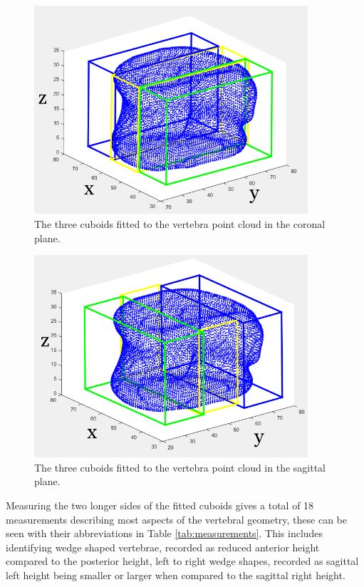\begin{figure}[ht!]
  \centering
  \includegraphics[width=4in]{Chapters/Chapter_PCA_images/Cuboid_fit_coronal.png}
  \caption{The three cuboids fitted to the vertebra point cloud in the coronal plane.}
  \label{fig:cuboid_cor}
\end{figure}

\begin{figure}[ht!]
  \centering
  \includegraphics[width=4in]{Chapters/Chapter_PCA_images/Cuboid_fit_sagital.png}
  \caption{The three cuboids fitted to the vertebra point cloud in the sagittal plane.}
  \label{fig:cuboid_sag}
\end{figure}

Measuring the two longer sides of the fitted cuboids gives a total of 18
measurements describing most aspects of the vertebral geometry, these can be
seen with their abbreviations in Table \ref{tab:measurements}.  This includes
identifying wedge shaped vertebrae, recorded as reduced anterior height
compared to the posterior height, left to right wedge shapes, recorded as
sagittal left height being smaller or larger when compared to the sagittal right
height.

